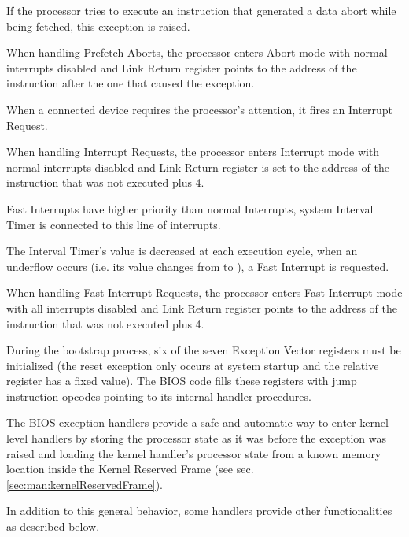 If the processor tries to execute an instruction that generated a data abort while being fetched, this exception is raised.

When handling Prefetch Aborts, the processor enters Abort mode with normal interrupts disabled and Link Return register points to the address of the instruction after the one that caused the exception.

When a connected device requires the processor's attention, it fires an Interrupt Request.

When handling Interrupt Requests, the processor enters Interrupt mode with normal interrupts disabled and Link Return register is set to the address of the instruction that was not executed plus 4.

Fast Interrupts have higher priority than normal Interrupts, system Interval Timer is connected to this line of interrupts. 

The Interval Timer's value is decreased at each execution cycle, when an underflow occurs (i.e. its value changes from  to ), a Fast Interrupt is requested.

When handling Fast Interrupt Requests, the processor enters Fast Interrupt mode with all interrupts disabled and Link Return register points to the address of the instruction that was not executed plus 4.

\label{sec:man:romExceptionHandlers}

During the bootstrap process, six of the seven Exception Vector registers must be initialized (the reset exception only occurs at system startup and the relative register has a fixed value).
The BIOS code fills these registers with jump instruction opcodes pointing to its internal handler procedures.

The BIOS exception handlers provide a safe and automatic way to enter kernel level handlers by storing the processor state as it was before the exception was raised and loading the kernel handler's processor state from a known memory location inside the Kernel Reserved Frame (see sec. \ref{sec:man:kernelReservedFrame}).

In addition to this general behavior, some handlers provide other functionalities as described below.


